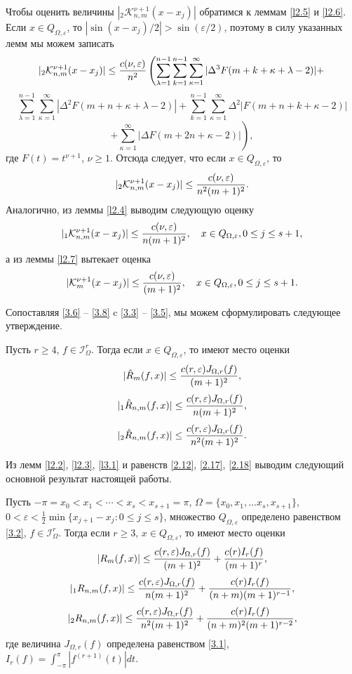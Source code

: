 Чтобы оценить величины $|_2\mathcal{ K}_{n,m}^{\nu+1}(x-x_{j})|$ обратимся к леммам \ref{l2.5} и \ref{l2.6}. Если $x\in Q_{\Omega,\varepsilon}$, то $|\sin(x-x_j)/2|>\sin(\varepsilon/2)$, поэтому в силу указанных лемм мы можем записать
$$
|_2\mathcal{ K}_{n,m}^{\nu+1}(x-x_j)|\le{c(\nu,\varepsilon)\over n^2}
\left(\sum\limits_{\lambda=1}^{n-1}\sum_{k=1}^{n-1}
\sum\limits_{\kappa=1}^{\infty}|\Delta^3F(m+k+\kappa+\lambda-2)|+\right.
$$
$$
 \sum\limits_{\lambda=1}^{n-1}
\sum\limits_{\kappa=1}^{\infty}|\Delta^2F(m+n+\kappa+\lambda-2)|
 +\sum_{k=1}^{n-1}
\sum\limits_{\kappa=1}^{\infty}\Delta^2|F(m+n+k+\kappa-2)|
$$
$$
 \left.+\sum\limits_{\kappa=1}^{\infty}|\Delta F(m+2n+\kappa-2)|\right),
$$
где $F(t)=t^{\nu+1} $, $\nu\ge1$. Отсюда следует, что если $x\in Q_{\Omega,\varepsilon}$, то
\begin{equation}\label{3.6}
|_2\mathcal{ K}_{n,m}^{\nu+1}(x-x_j)|\le{c(\nu,\varepsilon)\over n^2(m+1)^2}.
\end{equation}
Аналогично, из леммы \ref{l2.4}  выводим следующую оценку
\begin{equation}\label{3.7}
|_1\mathcal{ K}_{n,m}^{\nu+1}(x-x_j)|\le{c(\nu,\varepsilon)\over n(m+1)^2}, \quad x\in Q_{\Omega,\varepsilon}, 0\le j\le s+1,
\end{equation}
а из леммы \ref{l2.7}  вытекает оценка
\begin{equation}\label{3.8}
|\mathcal{ K}_{m}^{\nu+1}(x-x_j)|\le{c(\nu,\varepsilon)\over( m+1)^2}, \quad x\in Q_{\Omega,\varepsilon}, 0\le j\le s+1.
\end{equation}

Сопоставляя \eqref{3.6} -- \eqref{3.8} c \eqref{3.3} -- \eqref{3.5}, мы можем сформулировать следующее утверждение.
\begin{lemma}\label{l3.1}
Пусть $r \ge4$, $f\in\mathcal{ I}^r_\Omega$. Тогда если $x\in Q_{\Omega,\varepsilon}$, то
имеют место оценки
$$
|\hat R_{m}(f,x)|\le{c(r,\varepsilon)J_{\Omega,r}(f)\over (m+1)^2},
$$
$$
|_1\hat R_{n,m}(f,x)|\le{c(r,\varepsilon)J_{\Omega,r}(f)\over n(m+1)^2},
$$
$$
|_2\hat R_{n,m}(f,x)|\le{c(r,\varepsilon)J_{\Omega,r}(f)\over n^2(m+1)^2}.
$$
\end{lemma}

Из лемм \ref{l2.2}, \ref{l2.3}, \ref{l3.1} и равенств  \eqref{2.12}, \eqref{2.17},  \eqref{2.18} выводим следующий основной результат настоящей работы.
\begin{theorem}\label{theo1}
 Пусть $-\pi=x_0<x_1<\cdots<x_s<x_{s+1}=\pi$, $\Omega=\{x_0,x_1,\ldots x_s,x_{s+1}\}$,  $ 0<\varepsilon<\frac12\min\{x_{j+1}-x_{j}:0\le j\le s\}$, множество $Q_{\Omega,\varepsilon}$ определено равенством \eqref{3.2},
$f\in\mathcal{ I}^r_\Omega$. Тогда если $r\ge3$, $x\in Q_{\Omega,\varepsilon}$, то
имеют место оценки
$$
|R_{m}(f,x)|\le{c(r,\varepsilon)J_{\Omega,r}(f)\over (m+1)^2}+{c(r)I_r(f)\over (m+1)^{r}},
$$
$$
|_1R_{n,m}(f,x)|\le{c(r,\varepsilon)J_{\Omega,r}(f)\over n(m+1)^2}+{c(r)I_r(f)\over (n+m)(m+1)^{r-1}},
$$
$$
|_2R_{n,m}(f,x)|\le{c(r,\varepsilon)J_{\Omega,r}(f)\over n^2(m+1)^2}+{c(r)I_r(f)\over (n+m)^2(m+1)^{r-2}},
$$
где величина $J_{\Omega,r}(f)$ определена равенством \eqref{3.1},
 $I_r(f)=\int_{-\pi}^{\pi}|f^{(r+1)}(t)|dt$.
\end{theorem}

